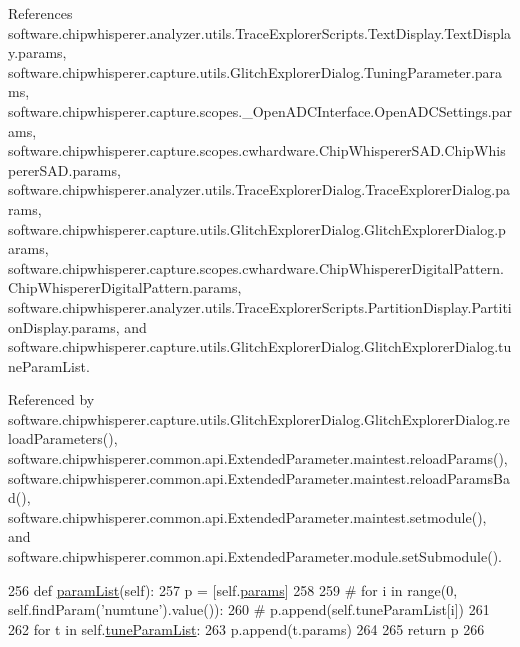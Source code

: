 References software.\+chipwhisperer.\+analyzer.\+utils.\+Trace\+Explorer\+Scripts.\+Text\+Display.\+Text\+Display.\+params, software.\+chipwhisperer.\+capture.\+utils.\+Glitch\+Explorer\+Dialog.\+Tuning\+Parameter.\+params, software.\+chipwhisperer.\+capture.\+scopes.\+\_\+\+Open\+A\+D\+C\+Interface.\+Open\+A\+D\+C\+Settings.\+params, software.\+chipwhisperer.\+capture.\+scopes.\+cwhardware.\+Chip\+Whisperer\+S\+A\+D.\+Chip\+Whisperer\+S\+A\+D.\+params, software.\+chipwhisperer.\+analyzer.\+utils.\+Trace\+Explorer\+Dialog.\+Trace\+Explorer\+Dialog.\+params, software.\+chipwhisperer.\+capture.\+utils.\+Glitch\+Explorer\+Dialog.\+Glitch\+Explorer\+Dialog.\+params, software.\+chipwhisperer.\+capture.\+scopes.\+cwhardware.\+Chip\+Whisperer\+Digital\+Pattern.\+Chip\+Whisperer\+Digital\+Pattern.\+params, software.\+chipwhisperer.\+analyzer.\+utils.\+Trace\+Explorer\+Scripts.\+Partition\+Display.\+Partition\+Display.\+params, and software.\+chipwhisperer.\+capture.\+utils.\+Glitch\+Explorer\+Dialog.\+Glitch\+Explorer\+Dialog.\+tune\+Param\+List.



Referenced by software.\+chipwhisperer.\+capture.\+utils.\+Glitch\+Explorer\+Dialog.\+Glitch\+Explorer\+Dialog.\+reload\+Parameters(), software.\+chipwhisperer.\+common.\+api.\+Extended\+Parameter.\+maintest.\+reload\+Params(), software.\+chipwhisperer.\+common.\+api.\+Extended\+Parameter.\+maintest.\+reload\+Params\+Bad(), software.\+chipwhisperer.\+common.\+api.\+Extended\+Parameter.\+maintest.\+setmodule(), and software.\+chipwhisperer.\+common.\+api.\+Extended\+Parameter.\+module.\+set\+Submodule().


\begin{DoxyCode}
256     \textcolor{keyword}{def }\hyperlink{classsoftware_1_1chipwhisperer_1_1capture_1_1utils_1_1GlitchExplorerDialog_1_1GlitchExplorerDialog_adab885fdced387456b7b6838e3df047f}{paramList}(self):
257         p = [self.\hyperlink{classsoftware_1_1chipwhisperer_1_1capture_1_1utils_1_1GlitchExplorerDialog_1_1GlitchExplorerDialog_a7e0298b93b2ce454ef185bdf31cd1007}{params}]
258 
259         \textcolor{comment}{# for i in range(0, self.findParam('numtune').value()):}
260         \textcolor{comment}{#    p.append(self.tuneParamList[i])}
261 
262         \textcolor{keywordflow}{for} t \textcolor{keywordflow}{in} self.\hyperlink{classsoftware_1_1chipwhisperer_1_1capture_1_1utils_1_1GlitchExplorerDialog_1_1GlitchExplorerDialog_adc4bbdddb1abd11ae9e8856f079592c3}{tuneParamList}:
263             p.append(t.params)
264 
265         \textcolor{keywordflow}{return} p
266 
\end{DoxyCode}
\hypertarget{classsoftware_1_1chipwhisperer_1_1capture_1_1utils_1_1GlitchExplorerDialog_1_1GlitchExplorerDialog_aa8215ca6f9497279be0aa9051bc83f90}{}
